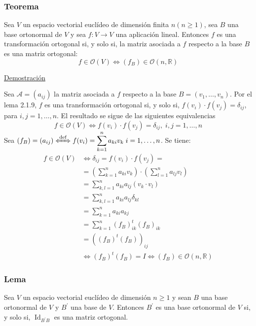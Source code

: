 \documentclass[12pt, a4paper, ones, notitlepage, openany,titlepage]{article}
\begin{document}
\subsubsection{Teorema}
Sea $V$ un espacio vectorial euclídeo de dimensión finita $n (n \ge 1)$, sea $B$ una base ortonormal de $V$ y sea $f: V \rightarrow V$ una aplicación lineal. Entonces $f$ es una transformación ortogonal si, y solo si, la matriz asociada a $f$ respecto a la base $B$ es una matriz ortogonal:
$$
f \in \mathcal{O}(V) \Longleftrightarrow \left(f_B\right) \in \mathcal{O}(n,\mathbb{R})
$$

\noindent\underline{Demostración}

Sea $\mathcal{A}=\left(a_{i j}\right)$ la matriz asociada a $f$ respecto a la base $B=\left(v_{1}, \ldots, v_{n}\right)$. Por el lema 2.1.9, $f$ es una transformación ortogonal si, y solo si, $f\left(v_{i}\right) \cdot f\left(v_{j}\right)=\delta_{i j}$, para $i, j=1, \ldots, n$. El resultado se sigue de las siguientes equivalencias
$$
f \in \mathcal{O}(V) \Longleftrightarrow f(v_i) \cdot f(v_j) = \delta_{ij}, \; i,j = 1,\ldots,n
$$
Sea $\displaystyle \left(f_B\right) = (a_{ij}) \xLeftrightarrow{\operatorname{def}} f(v_i) = \sum_{k=1}^{n} a_{ki} v_k \; i = 1,\ldots,n$. Se tiene:
$$
\begin{aligned}
	f \in \mathcal{O}(V) & \Longleftrightarrow \delta_{i j} = f\left(v_{i}\right) \cdot f\left(v_{j}\right) = \\
	& = \left(\sum_{k=1}^{n} a_{k i} v_{k}\right) \cdot\left(\sum_{l=1}^{n} a_{l j} v_{l}\right) \\
	& = \sum_{k, l=1}^{n} a_{k i} a_{l j} (v_k \cdot v_l) \\
	& = \sum_{k, l=1}^{n} a_{k i} a_{l j} \delta_{k l} \\
	& = \sum_{k=1}^{n} a_{k i} a_{k j} \\
	& = \sum_{k = 1}^{n} (f_B)^t_{ik} (f_B)_{ik} \\
	& = \left( (f_B)^t (f_B) \right)_{ij} \\
	& \Longleftrightarrow (f_B)^t (f_B) = I \Longleftrightarrow (f_B) \in \mathcal{O} (n, \mathbb{R})
\end{aligned}
$$

\subsubsection{Lema}
Sea $V$ un espacio vectorial euclídeo de dimensión $n \geq 1$ y sean $B$ una base ortonormal de $V$ y $B^{\prime}$ una base de $V$. Entonces $B^{\prime}$ es una base ortonormal de $V$ si, y solo si, $\operatorname{Id}_{B^{\prime} B}$ es una matriz ortogonal.\\
\end{document}

